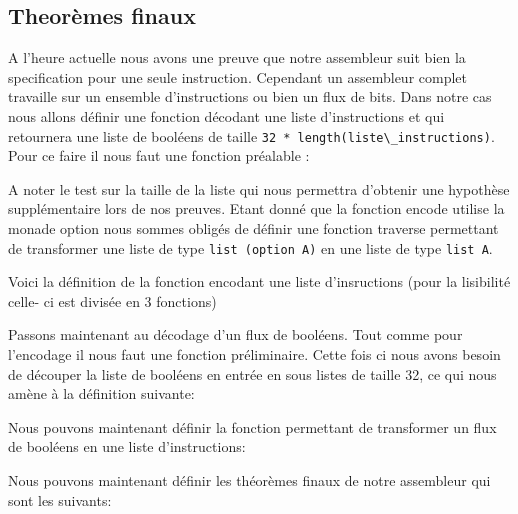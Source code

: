 \documentclass {article}
\newcommand{\codefrom}[3]
           {}
\theoremstyle{definition}
\theoremstyle{remark}
\newcommand{\fun}[1]{\lstinline!#1!}
\begin{document}
\subsection{Theorèmes finaux}

A l'heure actuelle nous avons une preuve que notre assembleur suit bien la specification
pour une seule instruction. Cependant un assembleur complet travaille sur un ensemble d'instructions
ou bien un flux de bits. Dans notre cas nous allons définir une fonction décodant une liste d'instructions et qui
retournera une liste de booléens de taille \fun{32 * length(liste\_instructions)}.
Pour ce faire il nous faut une fonction préalable :

\codefrom{src}{encode}{concat_listes_32}

A noter le test sur la taille de la liste
qui nous permettra d'obtenir une hypothèse supplémentaire lors de nos preuves.
Etant donné que la fonction encode utilise la monade option nous sommes obligés de définir une fonction
traverse permettant de transformer une liste de type \fun{list (option A)} en une liste de type \fun{list A}.

\codefrom{src}{encode}{traverse}

Voici la définition de la fonction encodant une liste d'insructions (pour la lisibilité celle- ci est
divisée en 3 fonctions)

\codefrom{src}{encode}{encode_flux}

Passons maintenant au décodage d'un flux de booléens. Tout comme pour l'encodage il nous faut
une fonction préliminaire. Cette fois ci nous avons besoin de découper la liste de booléens
en entrée en sous listes de taille 32, ce qui nous amène à la définition suivante:

\codefrom{src}{encode}{cut_32}

Nous pouvons maintenant définir la fonction permettant de transformer un flux de booléens
en une liste d'instructions:

\codefrom{src}{encode}{decode_flux}



Nous pouvons maintenant définir les théorèmes finaux de notre assembleur qui sont les suivants:

\codefrom{src}{encode}{encode_decode_flux_decoup}

\codefrom{src}{encode}{decode_flux_decoup_encode}

\end{document}
